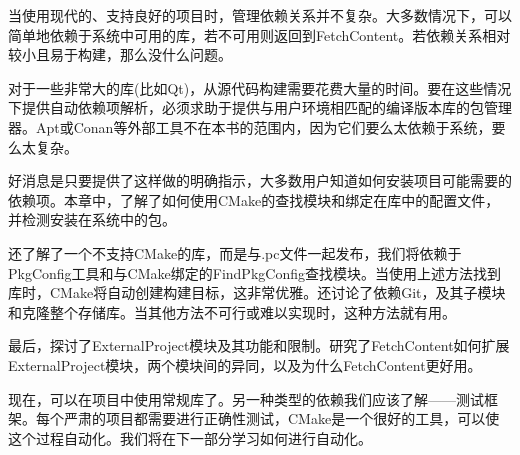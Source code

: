 当使用现代的、支持良好的项目时，管理依赖关系并不复杂。大多数情况下，可以简单地依赖于系统中可用的库，若不可用则返回到FetchContent。若依赖关系相对较小且易于构建，那么没什么问题。

对于一些非常大的库(比如Qt)，从源代码构建需要花费大量的时间。要在这些情况下提供自动依赖项解析，必须求助于提供与用户环境相匹配的编译版本库的包管理器。Apt或Conan等外部工具不在本书的范围内，因为它们要么太依赖于系统，要么太复杂。

好消息是只要提供了这样做的明确指示，大多数用户知道如何安装项目可能需要的依赖项。本章中，了解了如何使用CMake的查找模块和绑定在库中的配置文件，并检测安装在系统中的包。

还了解了一个不支持CMake的库，而是与.pc文件一起发布，我们将依赖于PkgConfig工具和与CMake绑定的FindPkgConfig查找模块。当使用上述方法找到库时，CMake将自动创建构建目标，这非常优雅。还讨论了依赖Git，及其子模块和克隆整个存储库。当其他方法不可行或难以实现时，这种方法就有用。

最后，探讨了ExternalProject模块及其功能和限制。研究了FetchContent如何扩展ExternalProject模块，两个模块间的异同，以及为什么FetchContent更好用。

现在，可以在项目中使用常规库了。另一种类型的依赖我们应该了解——测试框架。每个严肃的项目都需要进行正确性测试，CMake是一个很好的工具，可以使这个过程自动化。我们将在下一部分学习如何进行自动化。































